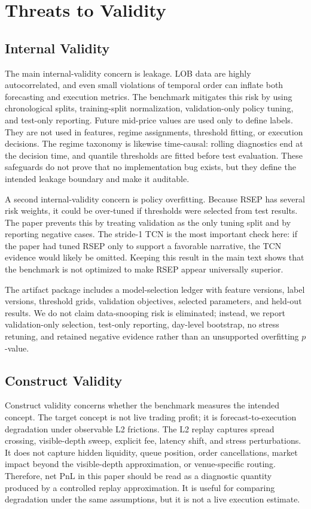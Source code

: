 \documentclass[conference]{IEEEtran}
\begin{document}
\section{Threats to Validity}
\subsection{Internal Validity}
The main internal-validity concern is leakage. LOB data are highly autocorrelated, and even small violations of temporal order can inflate both forecasting and execution metrics. The benchmark mitigates this risk by using chronological splits, training-split normalization, validation-only policy tuning, and test-only reporting. Future mid-price values are used only to define labels. They are not used in features, regime assignments, threshold fitting, or execution decisions. The regime taxonomy is likewise time-causal: rolling diagnostics end at the decision time, and quantile thresholds are fitted before test evaluation. These safeguards do not prove that no implementation bug exists, but they define the intended leakage boundary and make it auditable.

A second internal-validity concern is policy overfitting. Because RSEP has several risk weights, it could be over-tuned if thresholds were selected from test results. The paper prevents this by treating validation as the only tuning split and by reporting negative cases. The stride-1 TCN is the most important check here: if the paper had tuned RSEP only to support a favorable narrative, the TCN evidence would likely be omitted. Keeping this result in the main text shows that the benchmark is not optimized to make RSEP appear universally superior.

The artifact package includes a model-selection ledger with feature versions, label versions, threshold grids, validation objectives, selected parameters, and held-out results. We do not claim data-snooping risk is eliminated; instead, we report validation-only selection, test-only reporting, day-level bootstrap, no stress retuning, and retained negative evidence rather than an unsupported overfitting $p$-value.

\subsection{Construct Validity}
Construct validity concerns whether the benchmark measures the intended concept. The target concept is not live trading profit; it is forecast-to-execution degradation under observable L2 frictions. The L2 replay captures spread crossing, visible-depth sweep, explicit fee, latency shift, and stress perturbations. It does not capture hidden liquidity, queue position, order cancellations, market impact beyond the visible-depth approximation, or venue-specific routing. Therefore, net PnL in this paper should be read as a diagnostic quantity produced by a controlled replay approximation. It is useful for comparing degradation under the same assumptions, but it is not a live execution estimate.
\end{document}
